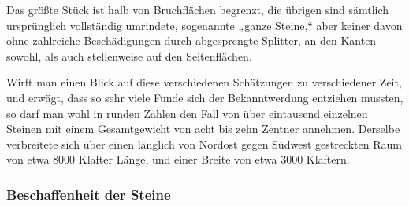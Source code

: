 \documentclass[a4paper, 11pt, oneside, german]{article}
\begin{document}
Das größte Stück ist halb von Bruchflächen begrenzt, die übrigen sind sämtlich ursprünglich vollständig umrindete, sogenannte „ganze Steine,“ aber keiner davon ohne zahlreiche Beschädigungen durch abgesprengte Splitter, an den Kanten sowohl, als auch stellenweise auf den Seitenflächen.

Wirft man einen Blick auf diese verschiedenen Schätzungen zu verschiedener Zeit, und erwägt, dass so sehr viele Funde sich der Bekanntwerdung entziehen mussten, so darf man wohl in runden Zahlen den Fall von über eintausend einzelnen Steinen mit einem Gesamtgewicht von acht bis zehn Zentner annehmen. Derselbe verbreitete sich über einen länglich von Nordost gegen Südwest gestreckten Raum von etwa 8000 Klafter Länge, und einer Breite von etwa 3000 Klaftern.
\clearpage
\subsubsection{Beschaffenheit der Steine}
\end{document}
